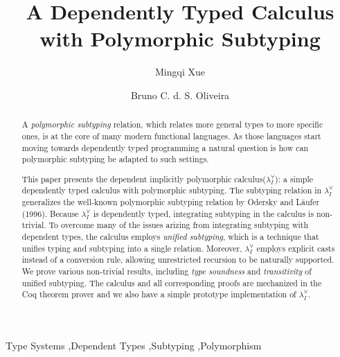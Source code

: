 \documentclass{elsarticle}
\title{A Dependently Typed Calculus with Polymorphic Subtyping}
\author{Mingqi Xue}
\author{Bruno C. d. S. Oliveira}
\newcommand{\system}[0]{the dependent implicitly polymorphic calculus\xspace}
\newcommand{\name}[0]{$\lambda_{I}^{\forall}$\xspace}
\begin{document}
\begin{abstract}
  A \emph{polymorphic subtyping} relation, which relates more general types
  to more specific ones, is at the core of many modern functional languages.
  As those languages start moving towards dependently typed programming a
  natural question is how can polymorphic subtyping be adapted to such settings.

  This paper presents \system (\name): a simple dependently typed calculus
  with polymorphic subtyping. The subtyping relation in \name
  generalizes the well-known polymorphic subtyping relation by
  Odersky and L\"aufer (1996). Because \name is dependently typed,
  integrating subtyping in the calculus is non-trivial. To overcome
  many of the issues arizing from integrating subtyping with dependent
  types, the calculus employs \emph{unified subtyping}, which is a technique
  that unifies typing and subtyping into a single relation. Moreover, \name
  employs explicit casts instead of a conversion rule, allowing
  unrestricted recursion to be naturally supported.
  We prove various non-trivial results, including \emph{type soundness} and \emph{transitivity}
  of unified subtyping. The calculus and all corresponding proofs
  are mechanized in the Coq theorem prover and we also have a simple prototype
  implementation of \name.
\end{abstract}


\begin{keyword}
  Type Systems \sep Dependent Types \sep Subtyping \sep Polymorphism
\end{keyword}

\maketitle









% 


\end{document}
